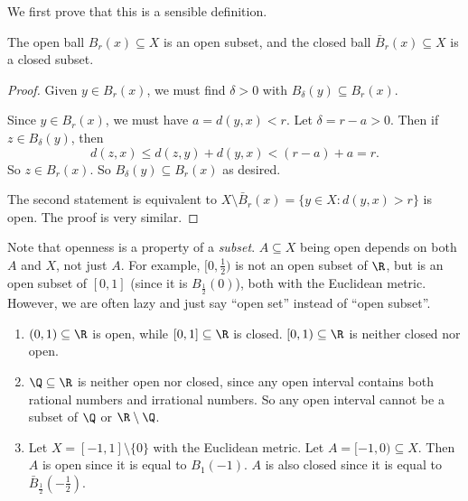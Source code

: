 \documentclass[a4paper]{article}
\begin{document}
We first prove that this is a sensible definition.
\begin{lemma}
  The open ball $B_r(x) \subseteq X$ is an open subset, and the closed ball $\bar{B}_r(x) \subseteq X$ is a closed subset.
\end{lemma}

\begin{proof}
  Given $y\in B_r(x)$, we must find $\delta > 0$ with $B_\delta(y) \subseteq B_r(x)$.
  \begin{center}
  \end{center}
  Since $y\in B_r(x)$, we must have $a = d(y, x) < r$. Let $\delta = r - a > 0$. Then if $z \in B_\delta (y)$, then
  \[
    d(z, x)\leq d(z, y) + d(y, x) < (r - a) + a = r.
  \]
  So $z \in B_r(x)$. So $B_\delta(y) \subseteq B_r(x)$ as desired.

  The second statement is equivalent to $X\setminus \bar{B}_r(x) = \{y\in X: d(y, x) > r\}$ is open. The proof is very similar.
\end{proof}
Note that openness is a property of a \emph{subset}. $A\subseteq X$ being open depends on both $A$ and $X$, not just $A$. For example, $[0, \frac{1}{2})$ is not an open subset of $\R$, but is an open subset of $[0, 1]$ (since it is $B_{\frac{1}{2}}(0)$), both with the Euclidean metric. However, we are often lazy and just say ``open set'' instead of ``open subset''.

\begin{eg}\leavevmode
  \begin{enumerate}
    \item $(0, 1)\subseteq \R$ is open, while $[0, 1]\subseteq \R$ is closed. $[0, 1)\subseteq \R$ is neither closed nor open.
    \item $\Q\subseteq \R$ is neither open nor closed, since any open interval contains both rational numbers and irrational numbers. So any open interval cannot be a subset of $\Q$ or $\R\setminus \Q$.
    \item Let $X = [-1, 1] \setminus \{0\}$ with the Euclidean metric. Let $A = [-1, 0)\subseteq X$. Then $A$ is open since it is equal to $B_1(-1)$. $A$ is also closed since it is equal to $\bar B_{\frac{1}{2}}(-\frac{1}{2})$.
  \end{enumerate}
\end{eg}
\end{document}
